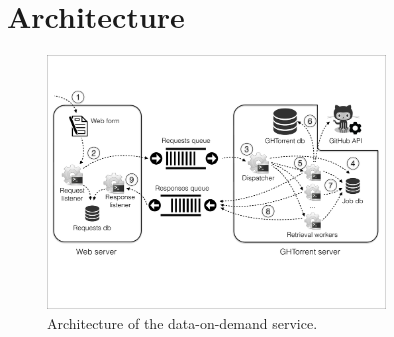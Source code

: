 
\section{Architecture}
\label{sec:arch}

\begin{figure}[t]
\begin{center}
\includegraphics[width=0.8\textwidth, trim=5 160 5 105, clip=True]{figures/architecture.pdf}
\caption{Architecture of the \ght data-on-demand service.}
\label{fig:architecture}
\end{center}
\end{figure}
